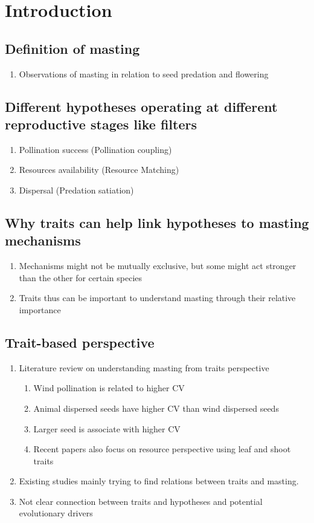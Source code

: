 \documentclass{article}
\begin{document}


\section{Introduction}
\subsection{Definition of masting}
\begin{enumerate}
\item Observations of masting in relation to seed predation and flowering
\end{enumerate}
\subsection{Different hypotheses operating at different reproductive stages like filters}
\begin{enumerate}
\item Pollination success (Pollination coupling)
\item Resources availability (Resource Matching)
\item Dispersal (Predation satiation)
\end{enumerate}
\subsection{Why traits can help link hypotheses to masting mechanisms}
\begin{enumerate}
\item Mechanisms might not be mutually exclusive, but some might act stronger than the other for certain species
\item Traits thus can be important to understand masting through their relative importance
\end{enumerate}
\subsection{Trait-based perspective}
\begin{enumerate}
\item Literature review on understanding masting from traits perspective 
\begin{enumerate}
\item Wind pollination is related to higher CV
\item Animal dispersed seeds have higher CV than wind dispersed seeds
\item Larger seed is associate with higher CV
\item Recent papers also focus on resource perspective using leaf and shoot traits
\end{enumerate}
\item Existing studies mainly trying to find relations between traits and masting.
\item Not clear connection between traits and hypotheses and potential evolutionary drivers
\end{enumerate}
\end{document}
